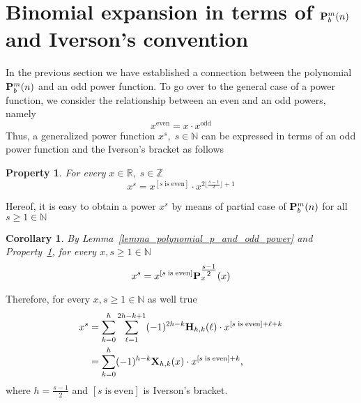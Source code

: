 \documentclass[12pt,letterpaper,oneside,reqno]{amsart}
\newcommand \iversonBracket [1][s]{[#1 \; \mathrm{is} \; \mathrm{even}]}
\newcommand \floor [1]{\lfloor #1 \rfloor}
\newcommand \coeffH [4][H] {{\mathbf{#1}} \sb{#2,#3} (#4)}
\newcommand \polynomialX [4][X] {{\mathbf{#1}}\sb{#2,#3} (#4)}
\newcommand \polynomialP [4][P]{{\mathbf{#1}}\sp{#2} \sb{#3}(#4)}
\newtheorem{cor}[thm]{Corollary}
\newtheorem{ppty}[thm]{Property}
\numberwithin{equation}{section}
\begin{document}
    \section{Binomial expansion in terms of \texorpdfstring{$\polynomialP{m}{b}{n}$}{P[m,b,n]}
        and Iverson's convention}
    In the previous section we have established a connection between the polynomial $\polynomialP{m}{b}{n}$
    and an odd power function.
    To go over to the general case of a power function, we consider the relationship between an even and an odd powers,
    namely
    \begin{equation*}
        x^{\mathrm{even}} = x \cdot x^{\mathrm{odd}}
    \end{equation*}
    Thus, a generalized power function $x^s, \; s \in \mathbb{N}$ can be expressed in terms of an odd power function
    and the Iverson's bracket as follows
    \begin{ppty}
        \label{ppty_odd_power_and_iverson}
        For every $x\in\mathbb{R}, \; s\in\mathbb{Z}$
        \begin{equation*}
            x^{s} = x^{\iversonBracket} \cdot x^{2 \floor{ \tfrac{s-1}{2} } + 1}
        \end{equation*}
    \end{ppty}
    Hereof, it is easy to obtain a power $x^s$ by means of partial case of $\polynomialP{m}{b}{n}$
    for all $s \geq 1 \in \mathbb{N}$
    \begin{cor}
        \label{cor_general_power_by_polynomial_p_and_iverson}
        By Lemma~\ref{lemma_polynomial_p_and_odd_power} and Property~\ref{ppty_odd_power_and_iverson},
        for every $x,s\geq 1 \in \mathbb{N}$
        \begin{equation*}
            x^s = x^{\iversonBracket} \polynomialP{\tfrac{s-1}{2}}{x}{x}
        \end{equation*}
    \end{cor}
    Therefore, for every $x,s\geq 1\in\mathbb{N}$ as well true
    \begin{equation*}
        \begin{split}
            x^s
            &=\sum_{k=0}^{h} \sum_{\ell=1}^{2h-k+1} (-1)^{2h-k} \coeffH{h}{k}{\ell} \cdot x^{\iversonBracket+\ell+k} \\
            &=\sum_{k=0}^{h} (-1)^{h-k} \polynomialX{h}{k}{x} \cdot x^{\iversonBracket+k},
        \end{split}
    \end{equation*}
    where $h=\frac{s-1}{2}$ and $\iversonBracket$ is Iverson's bracket.
\end{document}

